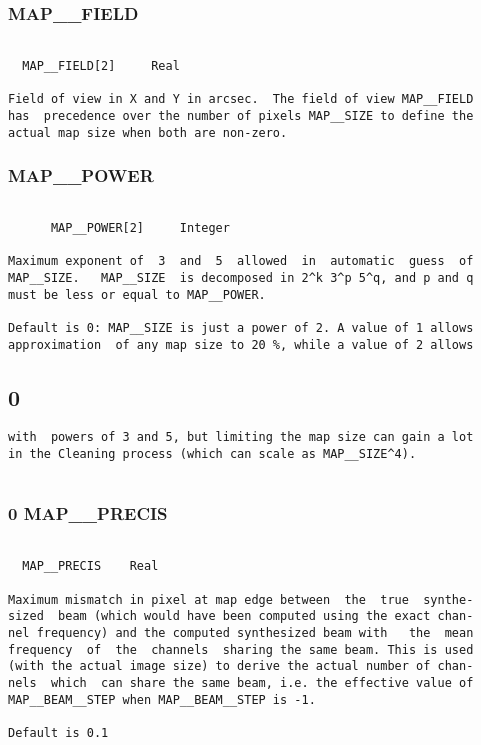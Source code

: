\subsubsection{MAP\_\_FIELD}
\begin{verbatim}

  MAP__FIELD[2]     Real

Field of view in X and Y in arcsec.  The field of view MAP__FIELD
has  precedence over the number of pixels MAP__SIZE to define the
actual map size when both are non-zero.

\end{verbatim}
\subsubsection{MAP\_\_POWER}
\begin{verbatim}

      MAP__POWER[2]     Integer

Maximum exponent of  3  and  5  allowed  in  automatic  guess  of
MAP__SIZE.   MAP__SIZE  is decomposed in 2^k 3^p 5^q, and p and q
must be less or equal to MAP__POWER.

Default is 0: MAP__SIZE is just a power of 2. A value of 1 allows
approximation  of any map size to 20 %, while a value of 2 allows
\end{verbatim}
\subsection{0}
\begin{verbatim}
with  powers of 3 and 5, but limiting the map size can gain a lot
in the Cleaning process (which can scale as MAP__SIZE^4).


\end{verbatim}
\subsubsection{0 MAP\_\_PRECIS}
\begin{verbatim}

  MAP__PRECIS    Real

Maximum mismatch in pixel at map edge between  the  true  synthe-
sized  beam (which would have been computed using the exact chan-
nel frequency) and the computed synthesized beam with   the  mean
frequency  of  the  channels  sharing the same beam. This is used
(with the actual image size) to derive the actual number of chan-
nels  which  can share the same beam, i.e. the effective value of
MAP__BEAM__STEP when MAP__BEAM__STEP is -1.

Default is 0.1

\end{verbatim}
